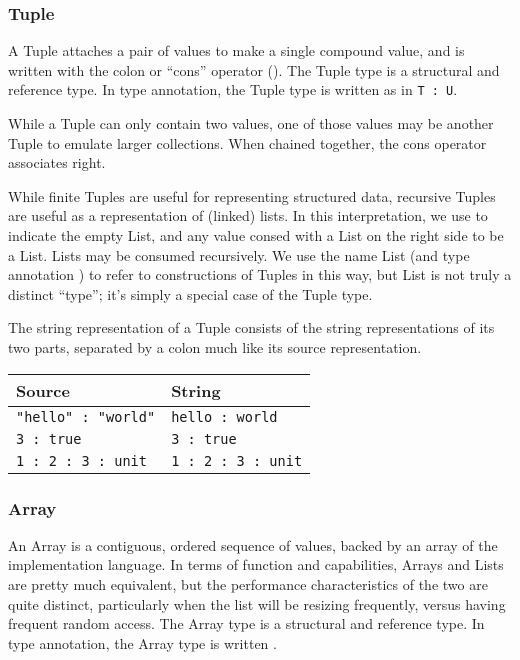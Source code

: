 \subsubsection{Tuple}

A Tuple attaches a pair of values to make a single compound value, and is written
with the colon or ``cons'' operator (\op{:}). The Tuple type is a structural and
reference type. In type annotation, the Tuple type is written as in \texttt{T : U}.

While a Tuple can only contain two values, one of those values may be another
Tuple to emulate larger collections. When chained together, the cons operator
associates right.

While finite Tuples are useful for representing structured data, recursive Tuples
are useful as a representation of (linked) lists. In this interpretation, we use
 to indicate the empty List, and any value consed with a List on the
right side to be a List. Lists may be consumed recursively. We use the name
List (and type annotation ) to refer to constructions of Tuples in
this way, but List is not truly a distinct ``type''; it's simply a special case
of the Tuple type.

The string representation of a Tuple consists of the string representations of its
two parts, separated by a colon much like its source representation.

\begin{table}[H]
    \centering
    \begin{tabular}{ll}
        \hline
        \textbf{Source} & \textbf{String} \\
        \hline
        \texttt{"hello" : "world"} & \texttt{hello : world} \\
        \texttt{3 : true} & \texttt{3 : true} \\
        \texttt{1 : 2 : 3 : unit} & \texttt{1 : 2 : 3 : unit} \\
        \hline
    \end{tabular}
\end{table}

\subsubsection{Array}

An Array is a contiguous, ordered sequence of values, backed by an array of
the implementation language. In terms of function and capabilities, Arrays
and Lists are pretty much equivalent, but the performance characteristics
of the two are quite distinct, particularly when the list will be resizing
frequently, versus having frequent random access. The Array type is a structural
and reference type. In type annotation, the Array type is written .

